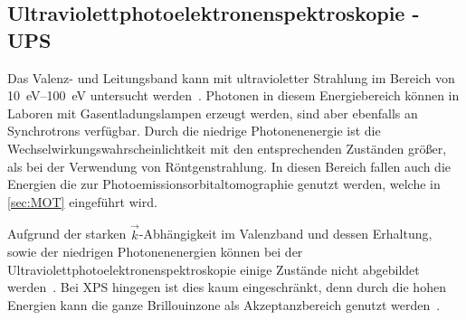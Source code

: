         

        \subsection{Ultraviolettphotoelektronenspektroskopie - UPS} \label{sec:UPS}
            Das Valenz- und Leitungsband kann mit ultravioletter Strahlung im Bereich von \SIrange{10}{100}{\electronvolt} untersucht werden~\cite{Fauster}.
            Photonen in diesem Energiebereich können in Laboren mit Gasentladungslampen erzeugt werden, sind aber ebenfalls an Synchrotrons verfügbar.
            Durch die niedrige Photonenenergie ist die Wechselwirkungswahrscheinlichtkeit mit den entsprechenden Zuständen größer, als bei der Verwendung von Röntgenstrahlung.
            In diesen Bereich fallen auch die Energien die zur Photoemissionsorbitaltomographie genutzt werden, welche in \autoref{sec:MOT} eingeführt wird.

            Aufgrund der starken $\vec{k}$-Abhängigkeit im Valenzband und dessen Erhaltung, sowie der niedrigen Photonenenergien können bei der Ultraviolettphotoelektronenspektroskopie einige Zustände nicht abgebildet werden~\cite{Hüfner}.
            Bei XPS hingegen ist dies kaum eingeschränkt, denn durch die hohen Energien kann die ganze Brillouinzone als Akzeptanzbereich genutzt werden~\cite{Hüfner}.

